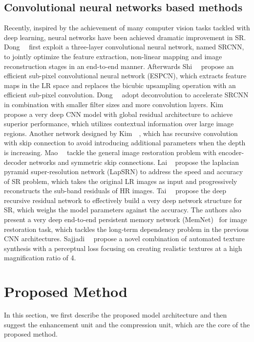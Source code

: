 \documentclass[10pt,twocolumn,letterpaper]{article}
\begin{document}
\subsection{Convolutional neural networks based methods}
Recently, inspired by the achievement of many computer vision tasks tackled with deep learning, neural networks have been achieved dramatic improvement in SR. Dong~\etal~\cite{SRCNN,SRCNN-Ex} first exploit a three-layer convolutional neural network, named SRCNN, to jointly optimize the feature extraction, non-linear mapping and image reconstruction stages in an end-to-end manner. Afterwards Shi~\etal~\cite{ESPCN} propose an efficient sub-pixel convolutional neural network (ESPCN), which extracts feature maps in the LR space and replaces the bicubic upsampling operation with an efficient sub-pixel convolution. Dong~\etal~\cite{FSRCNN} adopt deconvolution to accelerate SRCNN in combination with smaller filter sizes and more convolution layers. Kim~\etal~\cite{VDSR} propose a very deep CNN model with global residual architecture to achieve superior performance, which utilizes contextual information over large image regions. Another network designed by Kim~\etal~\cite{DRCN}, which has recursive convolution with skip connection to avoid introducing additional parameters when the depth is increasing. Mao~\etal~\cite{RED} tackle the general image restoration problem with encoder-decoder networks and symmetric skip connections. Lai \etal~\cite{LapSRN} propose the laplacian pyramid super-resolution network (LapSRN) to address the speed and accuracy of SR problem, which takes the original LR images as input and progressively reconstructs the sub-band residuals of HR images. Tai~\etal~\cite{DRRN} propose the deep recursive residual network to effectively build a very deep network structure for SR, which weighs the model parameters against the accuracy. The authors also present a very deep end-to-end persistent memory network (MemNet)~\cite{MemNet} for image restoration task, which tackles the long-term dependency problem in the previous CNN architectures. Sajjadi~\etal~\cite{EnhanceNet} propose a novel combination of automated texture synthesis with a perceptual loss focusing on creating realistic textures at a high magnification ratio of 4.

\section{Proposed Method}
In this section, we first describe the proposed model architecture and then suggest the enhancement unit and the compression unit, which are the core of the proposed method.
\end{document}
